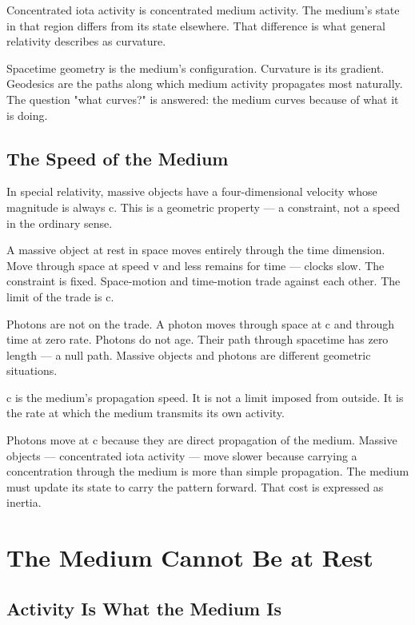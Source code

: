 \documentclass[11pt]{article}
\begin{document}
Concentrated iota activity is concentrated medium activity. The medium's state in
that region differs from its state elsewhere. That difference is what general
relativity describes as curvature.

Spacetime geometry is the medium's configuration. Curvature is its gradient.
Geodesics are the paths along which medium activity propagates most naturally.
The question "what curves?" is answered: the medium curves because of what it is
doing.

\subsection{The Speed of the Medium}
\label{sec:orgab5f3c1}

In special relativity, massive objects have a four-dimensional velocity whose
magnitude is always c. This is a geometric property — a constraint, not a speed
in the ordinary sense.

A massive object at rest in space moves entirely through the time dimension.
Move through space at speed v and less remains for time — clocks slow. The
constraint is fixed. Space-motion and time-motion trade against each other. The
limit of the trade is c.

Photons are not on the trade. A photon moves through space at c and through time
at zero rate. Photons do not age. Their path through spacetime has zero length —
a null path. Massive objects and photons are different geometric situations.

c is the medium's propagation speed. It is not a limit imposed from outside. It
is the rate at which the medium transmits its own activity.

Photons move at c because they are direct propagation of the medium. Massive
objects — concentrated iota activity — move slower because carrying a
concentration through the medium is more than simple propagation. The medium must
update its state to carry the pattern forward. That cost is expressed as inertia.

\section{The Medium Cannot Be at Rest}
\label{sec:orgeea2a97}

\subsection{Activity Is What the Medium Is}
\label{sec:org392bedf}
\end{document}
